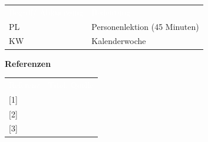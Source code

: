 \documentclass[10pt,paper=a4,final]{scrartcl}
\begin{document}
\begin{tabularx}{\textwidth}{l X}
\textcolor{white}{Begriff/ Abkuerzung}\cellcolor{blue!80!} & \textcolor{white}{Bedeutung}\cellcolor{blue!80!} \\
\cellcolor{blue!20!} PL & Personenlektion (45 Minuten) \cellcolor{blue!20!} \\
\cellcolor{blue!20!} KW & Kalenderwoche \cellcolor{blue!20!} \\
\end{tabularx}
\newline
\newline
\newline
{\bf Referenzen}
\newline

\begin{tabularx}{\textwidth}{l X}
\textcolor{white}{Referenz}\cellcolor{blue!80!} & \textcolor{white}{Titel, Quelle}\cellcolor{blue!80!} \\
\cellcolor{blue!20!}[1] & \cellcolor{blue!20!} \\
\cellcolor{blue!20!}[2] & \cellcolor{blue!20!} \\
\cellcolor{blue!20!}[3] & \cellcolor{blue!20!} \\
\end{tabularx}
\newpage
\end{document}
